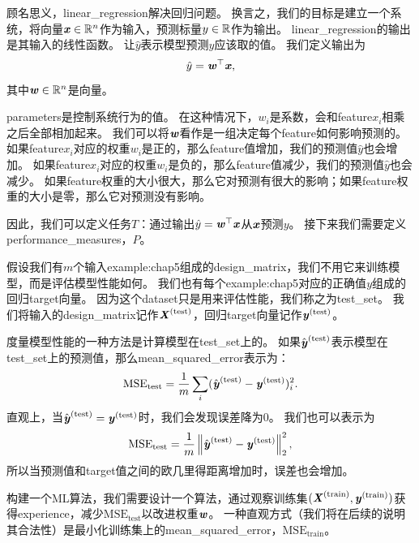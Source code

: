 顾名思义，\gls{linear_regression}解决回归问题。
换言之，我们的目标是建立一个系统，将向量$\boldsymbol{\mathit{x}}\in\mathbb{R}^n$作为输入，预测标量$y\in\mathbb{R}$作为输出。
\gls{linear_regression}的输出是其输入的线性函数。
让$\hat{y}$表示模型预测$y$应该取的值。
我们定义输出为
\begin{equation}
    \hat{y} = \boldsymbol{\mathit{w}}^\top \boldsymbol{\mathit{x}} ,
\end{equation}
其中$\boldsymbol{\mathit{w}}\in\mathbb{R}^n$是向量。

\gls{parameters}是控制系统行为的值。
在这种情况下，$w_i$是系数，会和\gls{feature}$x_i$相乘之后全部相加起来。
我们可以将$\boldsymbol{\mathit{w}}$看作是一组决定每个\gls{feature}如何影响预测的。
如果\gls{feature}$x_i$对应的权重$w_i$是正的，那么\gls{feature}值增加，我们的预测值$\hat{y}$也会增加。
如果\gls{feature}$x_i$对应的权重$w_i$是负的，那么\gls{feature}值减少，我们的预测值$\hat{y}$也会减少。
如果\gls{feature}权重的大小很大，那么它对预测有很大的影响；如果\gls{feature}权重的大小是零，那么它对预测没有影响。


因此，我们可以定义任务$T$：通过输出$\hat{y} = \boldsymbol{\mathit{w}}^\top \boldsymbol{\mathit{x}}$从$\boldsymbol{\mathit{x}}$预测$y$。
接下来我们需要定义\gls{performance_measures}，$P$。

假设我们有$m$个输入\gls{example:chap5}组成的\gls{design_matrix}，我们不用它来训练模型，而是评估模型性能如何。
我们也有每个\gls{example:chap5}对应的正确值$y$组成的回归\gls{target}向量。
因为这个\gls{dataset}只是用来评估性能，我们称之为\gls{test_set}。
我们将输入的\gls{design_matrix}记作$\boldsymbol{\mathit{X}}^{\text{(test)}}$，回归\gls{target}向量记作$\boldsymbol{\mathit{y}}^{(\text{test})}$。

度量模型性能的一种方法是计算模型在\gls{test_set}上的。
如果$\hat{\boldsymbol{\mathit{y}}}^{(\text{test})}$表示模型在\gls{test_set}上的预测值，那么\gls{mean_squared_error}表示为：
\begin{equation}
    \text{MSE}_{\text{test}} = \frac{1}{m} \sum_i ( \hat{\boldsymbol{\mathit{y}}}^{(\text{test})} - \boldsymbol{\mathit{y}}^{(\text{test})})_i^2.
\end{equation}
直观上，当$\hat{\boldsymbol{\mathit{y}}}^{(\text{test})} = \boldsymbol{\mathit{y}}^{(\text{test})}$时，我们会发现误差降为$0$。
我们也可以表示为
\begin{equation}
    \text{MSE}_{\text{test}} = \frac{1}{m} \left\lVert \hat{\boldsymbol{\mathit{y}}}^{(\text{test})} - \boldsymbol{\mathit{y}}^{(\text{test})}\right\rVert_2^2,
\end{equation}
所以当预测值和\gls{target}值之间的欧几里得距离增加时，误差也会增加。

构建一个\gls{ML}算法，我们需要设计一个算法，通过观察训练集$(\boldsymbol{\mathit{X}}^{(\text{train})},\boldsymbol{\mathit{y}}^{(\text{train})})$获得\gls{experience}，减少$\text{MSE}_{\text{test}}$以改进权重$\boldsymbol{\mathit{w}}$。
一种直观方式（我们将在后续的说明其合法性）是最小化训练集上的\gls{mean_squared_error}，$\text{MSE}_{\text{train}}$。

